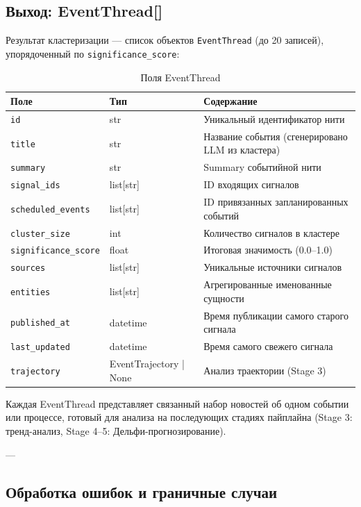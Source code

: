 
\subsection{Выход: EventThread[]}

Результат кластеризации --- список объектов \texttt{EventThread} (до 20 записей), упорядоченный по \texttt{significance\_score}:

\begin{table}[h!]
\centering
\caption{Поля EventThread}
\label{tab:event_thread}
\footnotesize
\begin{tabular}{|l|l|l|}
\hline
\textbf{Поле} & \textbf{Тип} & \textbf{Содержание} \\
\hline
\texttt{id} & str & Уникальный идентификатор нити \\
\texttt{title} & str & Название события (сгенерировано LLM из кластера) \\
\texttt{summary} & str & Summary событийной нити \\
\texttt{signal\_ids} & list[str] & ID входящих сигналов \\
\texttt{scheduled\_events} & list[str] & ID привязанных запланированных событий \\
\texttt{cluster\_size} & int & Количество сигналов в кластере \\
\texttt{significance\_score} & float & Итоговая значимость (0.0--1.0) \\
\texttt{sources} & list[str] & Уникальные источники сигналов \\
\texttt{entities} & list[str] & Агрегированные именованные сущности \\
\texttt{published\_at} & datetime & Время публикации самого старого сигнала \\
\texttt{last\_updated} & datetime & Время самого свежего сигнала \\
\texttt{trajectory} & EventTrajectory | None & Анализ траектории (Stage 3) \\
\hline
\end{tabular}
\end{table}

Каждая EventThread представляет связанный набор новостей об одном событии или процессе, готовый для анализа на последующих стадиях пайплайна (Stage 3: тренд-анализ, Stage 4--5: Дельфи-прогнозирование).

---

\subsection{Обработка ошибок и граничные случаи}

